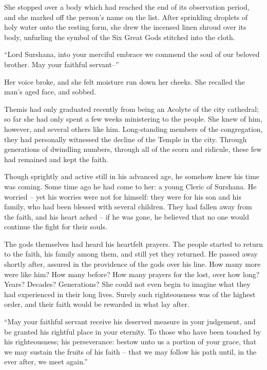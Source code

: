  

She stopped over a body which had reached the end of its observation period, and she marked off the person’s name on the list. After sprinkling droplets of holy water onto the resting form, she drew the incensed linen shroud over its body, unfurling the symbol of the Six Great Gods stitched into the cloth.

 

“Lord Surshana, into your merciful embrace we commend the soul of our beloved brother. May your faithful servant–”

 

Her voice broke, and she felt moisture run down her cheeks. She recalled the man’s aged face, and sobbed.

 

Themis had only graduated recently from being an Acolyte of the city cathedral; so far she had only spent a few weeks ministering to the people. She knew of him, however, and several others like him. Long-standing members of the congregation, they had personally witnessed the decline of the Temple in the city. Through generations of dwindling numbers, through all of the scorn and ridicule, these few had remained and kept the faith.

 

Though sprightly and active still in his advanced age, he somehow knew his time was coming. Some time ago he had come to her: a young Cleric of Surshana. He worried – yet his worries were not for himself: they were for his son and his family, who had been blessed with several children. They had fallen away from the faith, and his heart ached – if he was gone, he believed that no one would continue the fight for their souls.

 

The gods themselves had heard his heartfelt prayers. The people started to return to the faith, his family among them, and still yet they returned. He passed away shortly after, assured in the providence of the gods over his line. How many more were like him? How many before? How many prayers for the lost, over how long? Years? Decades? Generations? She could not even begin to imagine what they had experienced in their long lives. Surely such righteousness was of the highest order, and their faith would be rewarded in what lay after.

 

“May your faithful servant receive his deserved measure in your judgement, and be granted his rightful place in your eternity. To those who have been touched by his righteousness; his perseverance: bestow unto us a portion of your grace, that we may sustain the fruits of his faith – that we may follow his path until, in the ever after, we meet again.”


